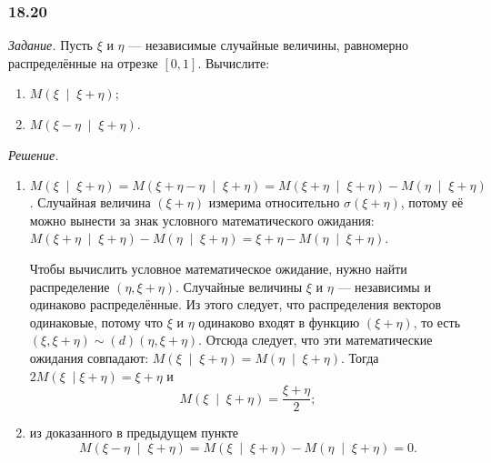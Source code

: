 \subsubsection{18.20}

\textit{Задание.}
Пусть $ \xi $ и $ \eta $ --- независимые случайные величины,
равномерно распределённые на отрезке $ \left[ 0, 1 \right] $.
Вычислите:
\begin{enumerate}[label=\alph*)]
  \item $M \left( \xi \; \middle| \; \xi + \eta \right) $;
  \item $M \left( \xi - \eta \; \middle| \; \xi + \eta \right) $.
\end{enumerate}

\textit{Решение.}
\begin{enumerate}[label=\alph*)]
  \item $M \left( \xi \; \middle| \; \xi + \eta \right) =
    M \left( \xi + \eta - \eta \; \middle| \; \xi + \eta \right) =
    M \left( \xi + \eta \; \middle| \; \xi + \eta \right) -
    M \left( \eta \; \middle| \; \xi + \eta \right) $.
  Случайная величина $ \left( \xi + \eta \right) $ измерима относительно
  $ \sigma \left( \xi + \eta \right) $,
  потому её можно вынести за знак условного математического ожидания:
  $M \left( \xi + \eta \; \middle| \; \xi + \eta \right) -
    M \left( \eta \; \middle| \; \xi + \eta \right) =
    \xi + \eta - M \left( \eta \; \middle| \; \xi + \eta \right) $.

  Чтобы вычислить условное математическое ожидание,
  нужно найти распределение $ \left( \eta, \xi + \eta \right) $.
  Случайные величины $ \xi $ и $ \eta $ --- независимы и одинаково распределённые.
  Из этого следует, что распределения векторов одинаковые,
  потому что $ \xi $ и $ \eta $ одинаково входят в функцию $ \left( \xi + \eta \right) $,
  то есть $ \left( \xi, \xi + \eta \right) \sim \left( d \right) \left( \eta , \xi + \eta \right) $.
  Отсюда следует, что эти математические ожидания совпадают:
  $M \left( \xi \; \middle| \; \xi + \eta \right) =
    M \left( \eta \; \middle| \; \xi + \eta \right) $.
  Тогда $2M \left( \xi \; \middle| \xi + \eta \right) = \xi + \eta $ и
  $$M \left( \xi \; \middle| \; \xi + \eta \right) =
    \frac{ \xi + \eta }{2};$$
  \item из доказанного в предыдущем пункте
  $$M \left( \xi - \eta \; \middle| \; \xi + \eta \right) =
    M \left( \xi \; \middle| \; \xi + \eta \right) -
    M \left( \eta \; \middle| \; \xi + \eta \right) =
    0.$$
\end{enumerate}

